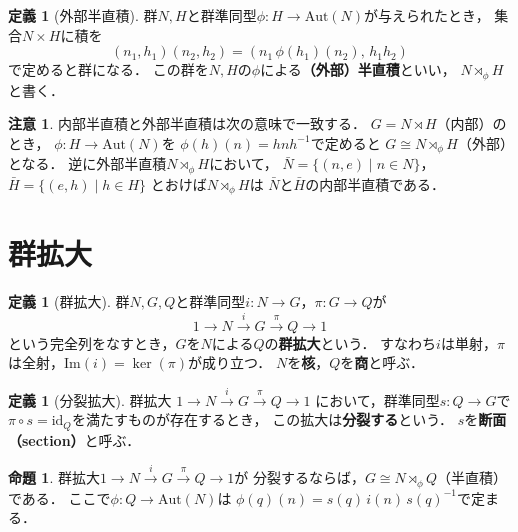 \documentclass[dvipdfmx,a4paper,12pt]{jsarticle}
\theoremstyle{definition}
\newtheorem{definition}[theorem]{定義}
\newtheorem{proposition}[theorem]{命題}
\newtheorem{remark}[theorem]{注意}
\begin{document}
\begin{definition}[外部半直積]
    群$N,H$と群準同型$\phi\colon H\to\mathrm{Aut}(N)$が与えられたとき，
    集合$N\times H$に積を
    $$(n_1,h_1)(n_2,h_2)=(n_1\,\phi(h_1)(n_2),\,h_1h_2)$$
    で定めると群になる．
    この群を$N,H$の$\phi$による\textbf{（外部）半直積}といい，
    $N\rtimes_\phi H$と書く．
\end{definition}

\begin{remark}
    内部半直積と外部半直積は次の意味で一致する．
    $G=N\rtimes H$（内部）のとき，
    $\phi\colon H\to\mathrm{Aut}(N)$を
    $\phi(h)(n)=hnh^{-1}$で定めると
    $G\cong N\rtimes_\phi H$（外部）となる．
    逆に外部半直積$N\rtimes_\phi H$において，
    $\bar{N}=\{(n,e)\mid n\in N\}$，
    $\bar{H}=\{(e,h)\mid h\in H\}$
    とおけば$N\rtimes_\phi H$は
    $\bar{N}$と$\bar{H}$の内部半直積である．
\end{remark}

\section{群拡大}

\begin{definition}[群拡大]
    群$N,G,Q$と群準同型$i\colon N\to G$，$\pi\colon G\to Q$が
    \begin{equation*}
        1\longrightarrow N\xrightarrow{\;i\;} G\xrightarrow{\;\pi\;} Q\longrightarrow 1
    \end{equation*}
    という完全列をなすとき，$G$を$N$による$Q$の\textbf{群拡大}という．
    すなわち$i$は単射，$\pi$は全射，$\mathrm{Im}(i)=\ker(\pi)$が成り立つ．
    $N$を\textbf{核}，$Q$を\textbf{商}と呼ぶ．
\end{definition}

\begin{definition}[分裂拡大]
    群拡大
    $1\to N\xrightarrow{i} G\xrightarrow{\pi} Q\to 1$
    において，群準同型$s\colon Q\to G$で
    $\pi\circ s=\mathrm{id}_Q$を満たすものが存在するとき，
    この拡大は\textbf{分裂する}という．
    $s$を\textbf{断面（section）}と呼ぶ．
\end{definition}

\begin{proposition}
    群拡大$1\to N\xrightarrow{i} G\xrightarrow{\pi} Q\to 1$が
    分裂するならば，$G\cong N\rtimes_\phi Q$（半直積）である．
    ここで$\phi\colon Q\to\mathrm{Aut}(N)$は
    $\phi(q)(n)=s(q)\,i(n)\,s(q)^{-1}$で定まる．
\end{proposition}
\end{document}
